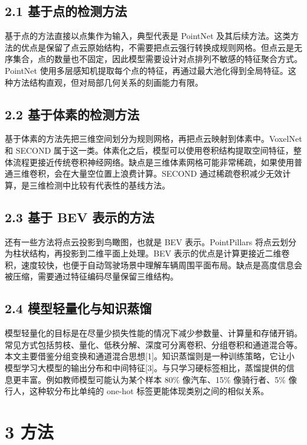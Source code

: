 \documentclass[UTF8]{ctexart}
\begin{document}
\subsection{2.1 基于点的检测方法}

基于点的方法直接以点集作为输入，典型代表是 PointNet 及其后续方法。这类方法的优点是保留了点云原始结构，不需要把点云强行转换成规则网格。但点云是无序集合，点的数量也不固定，因此模型需要设计对点排列不敏感的特征聚合方式。PointNet 使用多层感知机提取每个点的特征，再通过最大池化得到全局特征。这种方法结构直观，但对局部几何关系的刻画能力有限。


\subsection{2.2 基于体素的检测方法}

基于体素的方法先把三维空间划分为规则网格，再把点云映射到体素中。VoxelNet 和 SECOND 属于这一类。体素化之后，模型可以使用卷积结构提取空间特征，整体流程更接近传统卷积神经网络。缺点是三维体素网格可能非常稀疏，如果使用普通三维卷积，会在大量空位置上浪费计算。SECOND 通过稀疏卷积减少无效计算，是三维检测中比较有代表性的基线方法。


\subsection{2.3 基于 BEV 表示的方法}

还有一些方法将点云投影到鸟瞰图，也就是 BEV 表示。PointPillars 将点云划分为柱状结构，再投影到二维平面上处理。BEV 表示的优点是计算更接近二维卷积，速度较快，也便于自动驾驶场景中理解车辆周围平面布局。缺点是高度信息会被压缩，需要通过特征编码尽量保留三维结构。


\subsection{2.4 模型轻量化与知识蒸馏}

模型轻量化的目标是在尽量少损失性能的情况下减少参数量、计算量和存储开销。常见方式包括剪枝、量化、低秩分解、深度可分离卷积、分组卷积和通道混合等。本文主要借鉴分组变换和通道混合思想[1]。知识蒸馏则是一种训练策略，它让小模型学习大模型的输出分布和中间特征[3]。与只学习硬标签相比，蒸馏提供的信息更丰富。例如教师模型可能认为某个样本 80\% 像汽车、15\% 像骑行者、5\% 像行人，这种软分布比单纯的 one-hot 标签更能体现类别之间的相似关系。


\section{3 方法}
\end{document}
